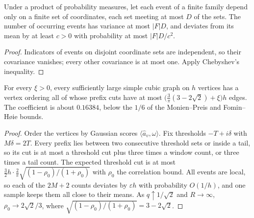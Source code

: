 \begin{lemma}
  \label{lem:lowerbounds-algebraic-gaussian-second-moment}
  \leanok
  Under a product of probability measures, let each event of a finite
  family depend only on a finite set of coordinates, each set meeting at
  most $D$ of the sets. The number of occurring events has variance at most
  $|F|D$, and deviates from its mean by at least $c>0$ with probability at
  most $|F|D/c^2$.
\end{lemma}
\begin{proof}
  \leanok
  Indicators of events on disjoint coordinate sets are independent, so
  their covariance vanishes; every other covariance is at most one. Apply
  Chebyshev's inequality.
\end{proof}

\begin{theorem}
  \label{thm:lowerbounds-algebraic-gaussian-cutwidth}
  \leanok
  For every $\xi>0$, every sufficiently large simple cubic graph on $h$
  vertices has a vertex ordering all of whose prefix cuts have at most
  $\bigl(\tfrac{3}{\pi}(3-2\sqrt2)+\xi\bigr)h$ edges. The coefficient is
  about $0.16384$, below the $1/6$ of the Monien–Preis and Fomin–Høie
  bounds.
\end{theorem}
\begin{proof}
  \leanok
  Order the vertices by Gaussian scores $\langle\hat a_v,\omega\rangle$.
  Fix thresholds $-T+i\delta$ with $M\delta=2T$. Every prefix lies between
  two consecutive threshold sets or inside a tail, so its cut is at most a
  threshold cut plus three times a window count, or three times a tail
  count. The expected threshold cut is at most
  $\tfrac32 h\cdot\tfrac2\pi\sqrt{(1-\rho_0)/(1+\rho_0)}$ with $\rho_0$ the
  correlation bound. All events are local, so each of the $2M+2$ counts
  deviates by $\varepsilon h$ with probability $O(1/h)$, and one sample
  keeps them all close to their means. As $q\uparrow 1/\sqrt2$ and
  $R\to\infty$, $\rho_0\to 2\sqrt2/3$, where
  $\sqrt{(1-\rho_0)/(1+\rho_0)}=3-2\sqrt2$.
\end{proof}

